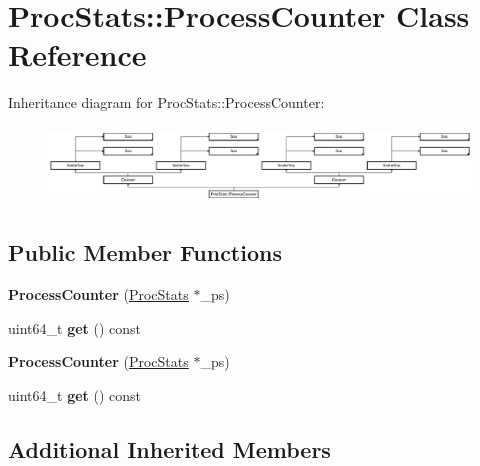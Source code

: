 \hypertarget{classProcStats_1_1ProcessCounter}{\section{Proc\-Stats\-:\-:Process\-Counter Class Reference}
\label{classProcStats_1_1ProcessCounter}
}
Inheritance diagram for Proc\-Stats\-:\-:Process\-Counter\-:\begin{figure}[H]
\begin{center}
\leavevmode
\includegraphics[height=2.046783cm]{classProcStats_1_1ProcessCounter}
\end{center}
\end{figure}
\subsection*{Public Member Functions}
\begin{DoxyCompactItemize}
\item 
\hypertarget{classProcStats_1_1ProcessCounter_a6db6f4ea589061f69c150b28bd6ddcde}{{\bfseries Process\-Counter} (\hyperlink{classProcStats}{Proc\-Stats} $\ast$\-\_\-ps)}\label{classProcStats_1_1ProcessCounter_a6db6f4ea589061f69c150b28bd6ddcde}

\item 
\hypertarget{classProcStats_1_1ProcessCounter_a52e07f80d1e0ae6000fe8a01f90d769d}{uint64\-\_\-t {\bfseries get} () const }\label{classProcStats_1_1ProcessCounter_a52e07f80d1e0ae6000fe8a01f90d769d}

\item 
\hypertarget{classProcStats_1_1ProcessCounter_a6db6f4ea589061f69c150b28bd6ddcde}{{\bfseries Process\-Counter} (\hyperlink{classProcStats}{Proc\-Stats} $\ast$\-\_\-ps)}\label{classProcStats_1_1ProcessCounter_a6db6f4ea589061f69c150b28bd6ddcde}

\item 
\hypertarget{classProcStats_1_1ProcessCounter_a52e07f80d1e0ae6000fe8a01f90d769d}{uint64\-\_\-t {\bfseries get} () const }\label{classProcStats_1_1ProcessCounter_a52e07f80d1e0ae6000fe8a01f90d769d}

\end{DoxyCompactItemize}
\subsection*{Additional Inherited Members}


